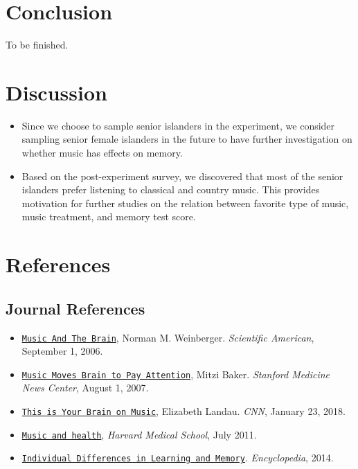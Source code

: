 \documentclass[]{article}
\providecommand{\tightlist}{%
  \setlength{\itemsep}{0pt}\setlength{\parskip}{0pt}}
\begin{document}
\section{Conclusion}\label{conclusion}

To be finished.

\section{Discussion}\label{discussion}

\begin{itemize}
\tightlist
\item
  Since we choose to sample senior islanders in the experiment, we
  consider sampling senior female islanders in the future to have
  further investigation on whether music has effects on memory.
\item
  Based on the post-experiment survey, we discovered that most of the
  senior islanders prefer listening to classical and country music. This
  provides motivation for further studies on the relation between
  favorite type of music, music treatment, and memory test score.
\end{itemize}

\section{References}\label{references}

\subsection{Journal References}\label{journal-references}

\begin{itemize}
\tightlist
\item
  \href{https://www.scientificamerican.com/article/music-and-the-brain-2006-09/}{\texttt{Music\ And\ The\ Brain}},
  Norman M. Weinberger. \emph{Scientific American}, September 1, 2006.
\item
  \href{https://med.stanford.edu/news/all-news/2007/07/music-moves-brain-to-pay-attention-stanford-study-finds.html}{\texttt{Music\ Moves\ Brain\ to\ Pay\ Attention}},
  Mitzi Baker. \emph{Stanford Medicine News Center}, August 1, 2007.
\item
  \href{https://www.cnn.com/2013/04/15/health/brain-music-research/index.html}{\texttt{This\ is\ Your\ Brain\ on\ Music}},
  Elizabeth Landau. \emph{CNN}, January 23, 2018.
\item
  \href{https://www.health.harvard.edu/staying-healthy/music-and-health}{\texttt{Music\ and\ health}},
  \emph{Harvard Medical School}, July 2011.
\item
  \href{https://www.encyclopedia.com/psychology/encyclopedias-almanacs-transcripts-and-maps/individual-differences-learning-and-memory}{\texttt{Individual\ Differences\ in\ Learning\ and\ Memory}}.
  \emph{Encyclopedia}, 2014.
\end{itemize}
\end{document}
